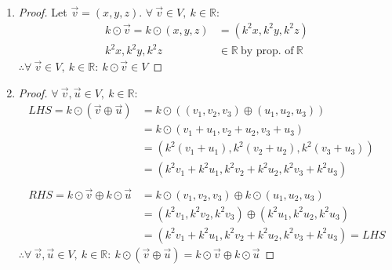 \documentclass{article}
\newcommand{\bld}{\textbf}
\newcommand{\bb}{\mathbb}
\newcommand{\bitem}[1]{\item[\bld{#1.}]}
\begin{document}
\begin{enumerate}
\begin{proof}
\begin{align*}
                             & = (v_1+-v_1,v_2+-v_2,v_3+-v_3)          &                        & = (-v_1+v_1,-v_2+v_2,-v_3+v_3)          \\
                             & = (0,0,0) =~\text{\bld{id}}             &                        & = (0,0,0) =~\text{\bld{id}}             \\
    \end{align*}
    $\therefore \vec{u}$ is the additive inverse of $\vec{v}$, $\forall~\vec{u} \in V$
  \end{proof}
  \bitem{Axiom 6}
  \begin{proof}
    Let $\vec{v}=(x,y,z)$. $\forall~\vec{v} \in V,~k \in \bb{R}$:
    \begin{align*}
      k \odot \vec{v} = k \odot (x,y,z) & = (k^2x,k^2y,k^2z)                   \\
      k^2x,k^2y,k^2z                    & \in \bb{R}~\text{by prop. of}~\bb{R}
    \end{align*}
    $\therefore \forall~\vec{v} \in V,~k \in \bb{R}:~k \odot \vec{v} \in V$
  \end{proof}
  \bitem{Axiom 7}
  \begin{proof}
    $\forall~\vec{v},\vec{u} \in V,~k \in \bb{R}$:
    \begin{align*}
      LHS = k \odot (\vec{v} \oplus \vec{u})       & = k \odot ((v_1,v_2,v_3) \oplus (u_1,u_2,u_3))         \\
                                                   & = k \odot (v_1+u_1,v_2+u_2,v_3+u_3)                    \\
                                                   & = (k^2(v_1+u_1), k^2(v_2+u_2), k^2(v_3+u_3))           \\
                                                   & = (k^2v_1+k^2u_1,k^2v_2+k^2u_2,k^2v_3+k^2u_3)          \\ \\
      RHS = k \odot \vec{v} \oplus k \odot \vec{u} & = k \odot (v_1,v_2,v_3) \oplus k \odot (u_1,u_2,u_3)   \\
                                                   & = (k^2v_1,k^2v_2,k^2v_3) \oplus (k^2u_1,k^2u_2,k^2u_3) \\
                                                   & = (k^2v_1+k^2u_1,k^2v_2+k^2u_2,k^2v_3+k^2u_3) = LHS
    \end{align*}
    $\therefore \forall~\vec{v},\vec{u} \in V,~k \in \bb{R}:~k \odot (\vec{v} \oplus \vec{u}) = k \odot \vec{v} \oplus k \odot \vec{u}$
  \end{proof}

\end{enumerate}
\end{document}
